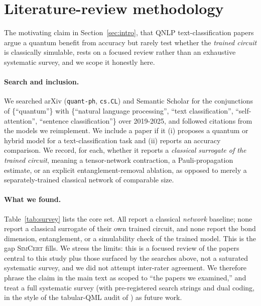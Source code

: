 \section{Literature-review methodology}\label{app:survey}
The motivating claim in Section~\ref{sec:intro}, that QNLP text-classification papers argue a
quantum benefit from accuracy but rarely test whether the \emph{trained circuit} is classically
simulable, rests on a focused review rather than an exhaustive systematic survey, and we scope it
honestly here.

\paragraph{Search and inclusion.} We searched arXiv (\texttt{quant-ph}, \texttt{cs.CL}) and
Semantic Scholar for the conjunctions of \{``quantum''\} with \{``natural language
processing'', ``text classification'', ``self-attention'', ``sentence classification''\} over
2019-2025, and followed citations from the models we reimplement. We include a paper if it (i)
proposes a quantum or hybrid model for a text-classification task and (ii) reports an accuracy
comparison. We record, for each, whether it reports a \emph{classical surrogate of the trained
circuit}, meaning a tensor-network contraction, a Pauli-propagation estimate, or an explicit
entanglement-removal ablation, as opposed to merely a separately-trained classical network of
comparable size.

\paragraph{What we found.} Table~\ref{tab:survey} lists the core set. All report a classical
\emph{network} baseline; none report a classical surrogate of their own trained circuit, and
none report the bond dimension, entanglement, or a simulability check of the trained model. This
is the gap \textsc{SimCert} fills. We stress the limits: this is a focused review of the papers
central to this study plus those surfaced by the searches above, not a saturated systematic
survey, and we did not attempt inter-rater agreement. We therefore phrase the claim in the main
text as scoped to ``the papers we examined,'' and treat a full systematic survey (with
pre-registered search strings and dual coding, in the style of the tabular-QML audit of
\citealp{bowles2024}) as future work.

